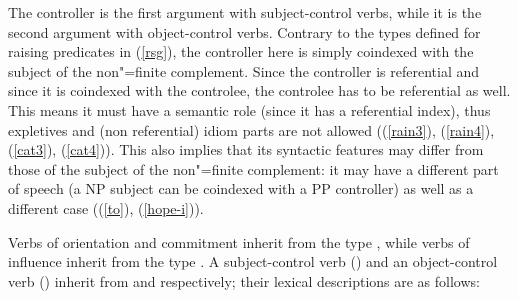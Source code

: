 The controller is the first argument with subject-control verbs, while it is the second argument
with object-control verbs. Contrary to the types defined for raising predicates in (\ref{rsg}), the
controller here is simply coindexed with the subject of the non"=finite complement. Since the
controller is referential and since it is coindexed with the controlee, the controlee has to be
referential as well. This means it must have a semantic role (since it has a referential index),
thus expletives and (non referential) idiom parts are not allowed ((\ref{rain3}), (\ref{rain4}),
(\ref{cat3}), (\ref{cat4})). This also implies that its syntactic features may differ from those of
the subject of the non"=finite complement: it may have a different part of speech (a NP subject can
be coindexed with a PP controller) as well as a different case ((\ref{to}), (\ref{hope-i})).

Verbs of orientation and commitment inherit from the type , while verbs of
influence inherit from the type .  A subject-control verb () and an
object-control verb () inherit from  and 
respectively; their lexical descriptions are as follows:


